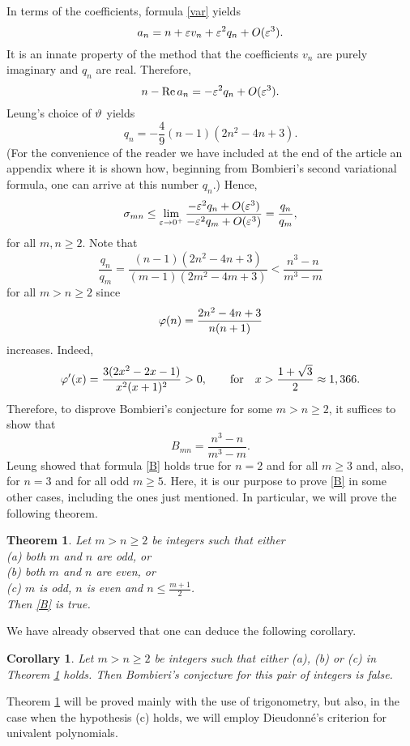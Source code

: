 \documentclass[11pt,reqno]{amsart}
\theoremstyle{plain}
\newtheorem{theorem}{Theorem}
\newtheorem*{corollary*}{Corollary}
\theoremstyle{definition}
\theoremstyle{remark}
\newcommand{\be}{\begin{equation}}
\newcommand{\ee}{\end{equation}}
\begin{document}
In terms of the coefficients, formula \eqref{var} yields 
$$
a_n = n +\varepsilon v_n +\varepsilon^2 q_n + O(\varepsilon^3).
$$
It is an innate property of the method that the coefficients $v_n$ are purely imaginary and $q_n$ are real. Therefore, 
$$
n-{\rm Re\,}a_n = -\varepsilon^2 q_n + O(\varepsilon^3).
$$
Leung's choice of $\vartheta$ yields  
\be \label{q_n}
q_n = -\frac{4}{9}(n-1)(2n^2 -4n+3).
\ee
(For the convenience of the reader we have included at the end of the article an appendix where it is shown how, beginning from Bombieri's second variational formula, one can arrive at this number $q_n$.) Hence, 
$$
\sigma_{mn} \leq \lim_{\varepsilon\to0^+} \frac{-\varepsilon^2 q_n + O(\varepsilon^3)}{-\varepsilon^2 q_m + O(\varepsilon^3)} = \frac{q_n}{q_m},
$$
for all $m,n\geq2$. Note that 
$$
\frac{q_n}{q_m} =  \frac{(n-1)(2n^2-4n+3)}{(m-1)(2m^2-4m+3)} <  \frac{n^3-n}{m^3-m} 
$$
for all $m > n\geq2$ since 
$$
\varphi(n) = \frac{2n^2-4n+3}{n(n+1)}
$$
increases. Indeed, 
$$
\varphi'(x) = \frac{3(2x^2-2x-1)}{x^2(x+1)^2} > 0, \qquad \text{for} \quad x>\frac{1+\sqrt3}{2}\approx 1,366.
$$
Therefore, to disprove Bombieri's conjecture for some $m > n\geq2$, it suffices to show that 
\be \label{B}
B_{mn} = \frac{n^3-n}{m^3-m}. 
\ee
Leung showed that formula \eqref{B} holds true for $n=2$ and for all $m\geq3$ and, also, for $n=3$ and for all odd $m\geq5$. Here, it is our purpose to prove \eqref{B} in some other cases, including the ones just mentioned. In particular, we will prove the following theorem. 

\begin{theorem} \label{Bmn}
Let $m>n\geq2$ be integers such that either \\ 
(a) both $m$ and $n$ are odd, or \\ 
(b) both $m$ and $n$ are even, or \\ 
(c) $m$ is odd, $n$ is even and $n\leq \frac{m+1}{2}$.\\
Then \eqref{B} is true.
\end{theorem}

We have already observed that one can deduce the following corollary. 

\begin{corollary*}
Let $m>n\geq2$ be integers such that either (a), (b) or (c) in \linebreak Theorem \ref{Bmn} holds. Then Bombieri's conjecture for this pair of integers is false. 
\end{corollary*}

Theorem \ref{Bmn} will be proved mainly with the use of trigonometry, but also, in the case when the hypothesis (c) holds, we will employ Dieudonn\'e's criterion for univalent polynomials. 
\end{document}
